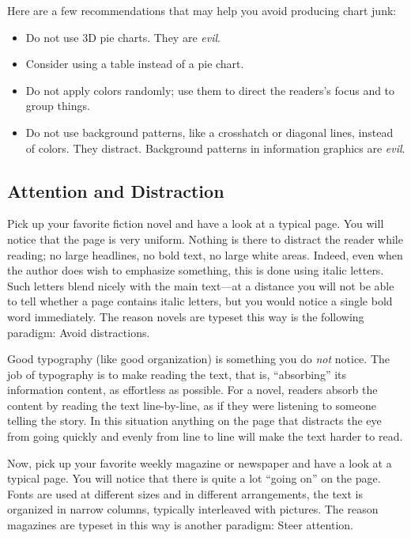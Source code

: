 Here are a few recommendations that may help you avoid producing chart junk:
\begin{itemize}
\item
  Do not use 3D pie charts. They are \emph{evil}.
\item
  Consider using a table instead of a pie chart.
\item
  Do not apply colors randomly; use them to direct the readers's
  focus and to group things.
\item
  Do not use background patterns, like a crosshatch or diagonal
  lines, instead of colors. They distract. Background patterns in
  information graphics are \emph{evil}.
\end{itemize}



\subsection{Attention and Distraction}

Pick up your favorite fiction novel and have a look at a typical
page. You will notice that the page is very uniform. Nothing is there
to distract the reader while reading; no large headlines, no bold
text, no large white areas. Indeed, even when the author does wish to
emphasize something, this is done using italic letters. Such letters
blend nicely with the main text---at a distance you will not be able to
tell whether a page contains italic letters, but you would notice a
single bold word immediately. The reason novels are typeset this way
is the following paradigm: Avoid distractions.

Good typography (like good organization) is something you do
\emph{not} notice. The job of typography is to make reading the text,
that is, ``absorbing'' its information content, as effortless as
possible. For a novel, readers absorb the content by reading the text
line-by-line, as if they were listening to someone telling the
story. In this situation anything on the page that distracts the eye
from  going quickly and evenly from line to line will make the text
harder to read.

Now, pick up your favorite weekly magazine or newspaper and have a
look at a typical
page. You will notice that there is quite a lot ``going on'' on the
page. Fonts are used at different sizes and in different arrangements,
the text is organized in narrow columns, typically interleaved with
pictures. The reason magazines are typeset in this way is another
paradigm: Steer attention.

